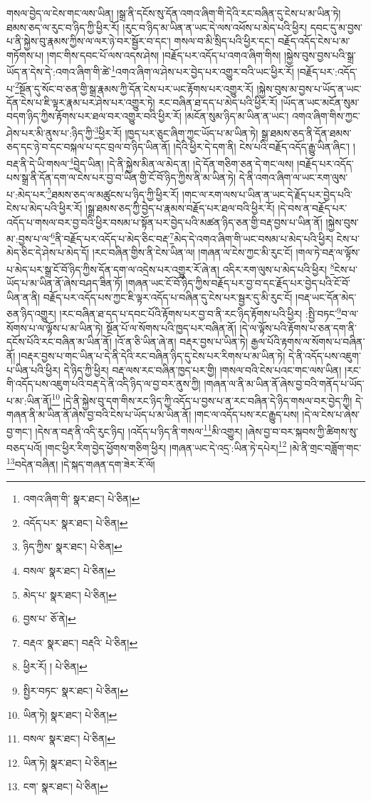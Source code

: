 གསལ་བྱེད་ལ་ངེས་གང་ལས་ཡིན། །སྒྲ་ནི་དངོས་སུ་དོན་འགའ་ཞིག་གི་དེའི་རང་བཞིན་དུ་ངེས་པ་མ་ཡིན་ཏེ། ཐམས་ཅད་ལ་རུང་བ་ཉིད་ཀྱི་ཕྱིར་རོ། །རུང་བ་ཉིད་མ་ཡིན་ན་ཡང་དེ་ལས་འཕོས་པ་མེད་པའི་ཕྱིར། དབང་དུ་མ་བྱས་པ་ནི་སྐྱེས་བུ་རྣམས་ཀྱིས་ལ་ལར་ཉེ་བར་སྦྱོར་བ་དང་། གསལ་བ་མི་སྲིད་པའི་ཕྱིར་དང་། བརྗོད་འདོད་ངེས་པ་མ་གཏོགས་པ། །གང་གིས་དབང་པོ་ལས་འདས་ཤེས། །བརྗོད་པར་འདོད་པ་འགའ་ཞིག་གིས། །སྐྱེས་བུས་བྱས་པའི་སྒྲ་ཡོད་ན་དེས་དེ་:འགའ་ཞིག་གི་ཚེ་\footnote{འགའ་ཞིག་གི་  སྣར་ཐང་།  པེ་ཅིན། }འགའ་ཞིག་ལ་ཤེས་པར་བྱེད་པར་འགྱུར་བའི་ཡང་ཕྱིར་རོ། །བརྗོད་པར་:འདོད་པ་\footnote{འདོད་པར་  སྣར་ཐང་།  པེ་ཅིན། }སྔོན་དུ་སོང་བ་ཅན་གྱི་སྒྲ་རྣམས་ཀྱི་དོན་ངེས་པར་ཡང་རྟོགས་པར་འགྱུར་རོ། །སྐྱེས་བུས་མ་བྱས་པ་ཡོད་ན་ཡང་དོན་ངེས་པ་ཇི་ལྟར་རྣམ་པར་ཤེས་པར་འགྱུར་ཏེ། རང་བཞིན་ཐ་དད་པ་མེད་པའི་ཕྱིར་རོ། །ཡོད་ན་ཡང་མངོན་སུམ་བདག་ཉིད་ཀྱིས་རྟོགས་པར་ཐལ་བར་འགྱུར་བའི་ཕྱིར་རོ། །མངོན་སུམ་ཉིད་མ་ཡིན་ན་ཡང་། འགའ་ཞིག་གིས་ཀྱང་ཤེས་པར་མི་ནུས་པ་:ཉིད་ཀྱི་\footnote{ཉིད་ཀྱིས་  སྣར་ཐང་།  པེ་ཅིན། }ཕྱིར་རོ། །ཁྱད་པར་ཅུང་ཞིག་ཀྱང་ཡོད་པ་མ་ཡིན་ཏེ། སྒྲ་ཐམས་ཅད་ནི་དོན་ཐམས་ཅད་དང་ཉེ་བ་དང་བསྐལ་པ་དང་བྲལ་བ་ཉིད་ཡིན་ནོ། །དེའི་ཕྱིར་དེ་དག་ནི། ངེས་པའི་བརྗོད་འདོད་རྒྱུ་ཡིན་ཞིང་། །བརྡ་ནི་དེ་ཡི་གསལ་\footnote{བསལ་  སྣར་ཐང་།  པེ་ཅིན། }བྱེད་ཡིན། །དེ་ནི་སྐྱེས་མིན་ལ་མེད་ན། །དེ་དོན་གཅིག་ཅན་དེ་གང་ལས། །བརྗོད་པར་འདོད་པས་སྒྲ་ནི་དོན་དག་ལ་ངེས་པར་བྱ་བ་ཡིན་གྱི་ངོ་བོ་ཉིད་ཀྱིས་ནི་མ་ཡིན་ཏེ། དེ་ནི་འགའ་ཞིག་ལ་ཡང་རག་ལུས་པ་:མེད་པར་\footnote{མེད་པ་  སྣར་ཐང་།  པེ་ཅིན། }ཐམས་ཅད་ལ་མཚུངས་པ་ཉིད་ཀྱི་ཕྱིར་རོ། །གང་ལ་རག་ལས་པ་ཡིན་ན་ཡང་དེ་རྗོད་པར་བྱེད་པའི་ངེས་པ་མེད་པའི་ཕྱིར་རོ། །སྒྲ་ཐམས་ཅད་ཀྱི་བྱེད་པ་རྣམས་བརྗོད་པར་ཐལ་བའི་ཕྱིར་རོ། །དེ་བས་ན་བརྗོད་པར་འདོད་པ་གསལ་བར་བྱ་བའི་ཕྱིར་བསམ་པ་སྟོན་པར་བྱེད་པའི་མཚན་ཉིད་ཅན་གྱི་བརྡ་བྱས་པ་ཡིན་ནོ། །སྐྱེས་བུས་མ་:བྱས་པ་ལ་\footnote{བྱས་པ་  ཅོ་ནེ། }ནི་བརྗོད་པར་འདོད་པ་མེད་ཅིང་བརྡ་\footnote{བརྡའ་  སྣར་ཐང་། བརྡའི་  པེ་ཅིན། }མེད་དེ་འགའ་ཞིག་གི་ཡང་བསམ་པ་མེད་པའི་ཕྱིར། ངེས་པ་མེད་ཅིང་དེ་ཤེས་པ་མེད་དོ། །རང་བཞིན་གྱིས་ནི་ངེས་ཡིན་ལ། །གཞན་ལ་ངེས་ཀྱང་མི་རུང་ངོ། །གལ་ཏེ་བརྡ་ལ་ལྟོས་པ་མེད་པར་སྒྲ་ངོ་བོ་ཉིད་ཀྱིས་དོན་དག་ལ་འདྲེས་པར་འགྱུར་རོ་ཞེ་ན། འདིར་རག་ལུས་པ་མེད་པའི་ཕྱིར། \footnote{ཕྱིར་རོ། །   པེ་ཅིན། }ངེས་པ་ཡོད་པ་མ་ཡིན་ནོ་ཞེས་བཤད་ཟིན་ཏོ། །གཞན་ཡང་ངོ་བོ་ཉིད་ཀྱིས་བརྗོད་པར་བྱ་བ་དང་རྗོད་པར་བྱེད་པའི་ངོ་བོ་ཡིན་ན་ནི། བརྗོད་པར་འདོད་པས་ཀྱང་ཇི་ལྟར་འདོད་པ་བཞིན་དུ་ངེས་པར་སྦྱར་དུ་མི་རུང་ངོ། །བརྡ་ཡང་དོན་མེད་ཅན་ཉིད་འགྱུར། །རང་བཞིན་ཐ་དད་པ་དབང་པོའི་རྟོགས་པར་བྱ་བ་ནི་རང་ཉིད་རྟོགས་པའི་ཕྱིར། :སྤྱི་བཏང་\footnote{སྤྱིར་བཏང་  སྣར་ཐང་།  པེ་ཅིན། }བ་ལ་སོགས་པ་ལ་ལྟོས་པ་མ་ཡིན་ཏེ། སྔོན་པོ་ལ་སོགས་པའི་ཁྱད་པར་བཞིན་ནོ། །དེ་ལ་ལྟོས་པའི་རྟོགས་པ་ཅན་དག་ནི་དངོས་པོའི་རང་བཞིན་མ་ཡིན་ནོ། །འོ་ན་ཅི་ཡིན་ཞེ་ན། བརྡར་བྱས་པ་ཡིན་ཏེ། རྒྱལ་པོའི་རྟགས་ལ་སོགས་པ་བཞིན་ནོ། །བརྡར་བྱས་པ་གང་ཡིན་པ་དེ་ནི་དེའི་རང་བཞིན་ཉིད་དུ་ངེས་པར་རིགས་པ་མ་ཡིན་ཏེ། དེ་ནི་འདོད་པས་འཇུག་པ་ཡིན་པའི་ཕྱིར། དེ་ཉིད་ཀྱི་ཕྱིར། བརྡ་ལས་རང་བཞིན་ཁྱད་པར་གྱི། །གསལ་བའི་ངེས་པའང་གང་ལས་ཡིན། །རང་གི་འདོད་པས་འཇུག་པའི་བརྡ་དེ་ནི་འདི་ཉིད་ལ་བྱ་བར་ནུས་ཀྱི། །གཞན་ལ་ནི་མ་ཡིན་ནོ་ཞེས་བྱ་བའི་གནོད་པ་ཡོད་པ་མ་:ཡིན་ནོ།\footnote{ཡིན་ཏེ།  སྣར་ཐང་།  པེ་ཅིན། } །དེ་ནི་སྐྱེས་བུ་དག་གིས་རང་ཉིད་ཀྱི་འདོད་པ་བྱས་པ་ན་རང་བཞིན་དེ་ཉིད་གསལ་བར་བྱེད་ཀྱི། དེ་གཞན་ནི་མ་ཡིན་ནོ་ཞེས་བྱ་བའི་ངེས་པ་ཡོད་པ་མ་ཡིན་ནོ། །གང་ལ་འདོད་པས་རང་རྒྱུད་པས། །དེ་ལ་ངེས་པ་ཞེས་བྱ་གང་། །དེས་ན་བརྡ་ནི་འདི་རུང་ཉིད། །འདོད་པ་ཉིད་ནི་གསལ་\footnote{བསལ་  སྣར་ཐང་།  པེ་ཅིན། }མི་འགྱུར། །ཞེས་བྱ་བ་བར་སྐབས་ཀྱི་ཚིགས་སུ་བཅད་པའོ། །གང་ཕྱིར་རིག་བྱེད་ཕྱོགས་གཅིག་ཕྱིར། །གཞན་ཡང་དེ་འདྲ་:ཡིན་ཏེ་དཔེར།\footnote{ཡིན་ཏེ།  སྣར་ཐང་།  པེ་ཅིན། } །མེ་ནི་གྲང་བཟློག་གང་\footnote{ངག་  སྣར་ཐང་།  པེ་ཅིན། }བདེན་བཞིན། །དེ་སྐད་གཞན་དག་ཟེར་རོ་ལོ། 